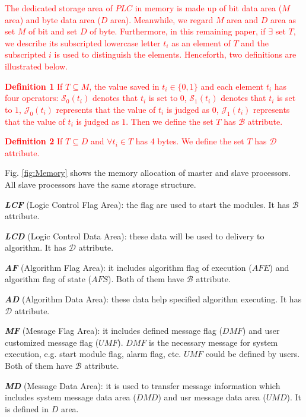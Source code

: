 \documentclass[journal,UTF8]{IEEEtran}
\begin{document}
\textcolor{red}{The dedicated storage area of $PLC$ in memory is made up of bit data area ($M$ area) and byte data area ($D$ area). Meanwhile, we regard $M$ area and $D$ area as set $M$ of bit and set $D$ of byte. Furthermore, in this remaining paper, if $\exists$ set $T$, we describe its subscripted lowercase letter $t_i$ as an element of $T$ and the subscripted $i$ is used to distinguish the elements. Henceforth, two definitions are illustrated below.}

\textcolor{red}{\textbf{Definition 1} If $ T \subseteq M$, the value saved in $t_{i} \in \{0, 1\} $ and each element $t_i$ has four operators: $\mathcal{S}_0(t_i)$ denotes that $t_i$ is set to $0$, $\mathcal{S}_1(t_i)$ denotes that $t_i$ is set to $1$, $\mathcal{J}_0(t_i)$ represents that the value of $t_i$ is judged as $0$, $\mathcal{J}_1(t_i)$ represents that the value of $t_i$ is judged as $1$. Then we define the set $T$ has $\mathcal{B}$ attribute.}

\textcolor{red}{\textbf{Definition 2} If $ T \subseteq D$ and $\forall t_{i} \in T$ has 4 bytes. We define the set $T$ has $\mathcal{D}$ attribute.}


Fig. \ref{fig:Memory} shows the memory allocation of master and slave processors. All slave processors have the same storage structure.

\textbf{\emph{LCF}} (Logic Control Flag Area): the flag are used to start the modules. It has $\mathcal{B}$ attribute.

\textbf{\emph{LCD}} (Logic Control Data Area): these data will be used to delivery to algorithm. It has $\mathcal{D}$ attribute.

\textbf{\emph{AF}} (Algorithm Flag Area): it includes algorithm flag of execution ($AFE$) and algorithm flag of state ($AFS$). Both of them have $\mathcal{B}$ attribute.

\textbf{\emph{AD}} (Algorithm Data Area): these data help specified algorithm executing. It has $\mathcal{D}$ attribute.

\textbf{\emph{MF}} (Message Flag Area): it includes defined message flag ($DMF$) and user customized message flag ($UMF$). $DMF$ is the necessary message for system execution, e.g. start module flag, alarm flag, etc. $UMF$ could be defined by users. Both of them have $\mathcal{B}$ attribute.

\textbf{\emph{MD}} (Message Data Area): it is used to transfer message information which includes system message data area ($DMD$) and usr message data area ($UMD$). It is defined in $D$ area.
\end{document}
